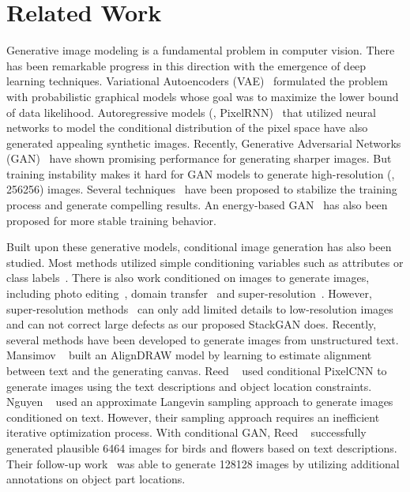 \documentclass[10pt,twocolumn,letterpaper]{article}
\begin{document}
\vspace{-2pt}
\section{Related Work}
 \vspace{-5pt}

Generative image modeling is a fundamental problem in computer vision. There has been remarkable progress in this direction with the emergence of deep learning techniques. Variational Autoencoders (VAE)~\cite{KingmaW14, RezendeMW14} formulated the problem with probabilistic graphical models whose goal was to maximize the lower bound of data likelihood. Autoregressive models (\eg, PixelRNN)~\cite{OordKK16} that utilized neural networks to model the conditional distribution of the pixel space have also generated appealing synthetic images. Recently, Generative Adversarial Networks (GAN)~\cite{goodfellow2014generative} have shown promising performance for generating sharper images. But training instability makes it hard for GAN models to generate high-resolution (\eg, 256256) images. Several techniques~\cite{Radford15, Salimans2016, MetzICLR17, ArjovskyB17, CheLJBL16} have been proposed to stabilize the training process and generate compelling results. An energy-based GAN~\cite{Zhao2016} has also been proposed for more stable training behavior.  

Built upon these generative models, conditional image generation has also been studied. Most methods utilized simple conditioning variables such as attributes or class labels~\cite{YanYSL16, Oord16, ChenDHSSA16, Odena2016}. There is also work conditioned on images to generate images, including photo editing~\cite{Brock2016, ZhuKSE16}, domain transfer~\cite{Taigmaniclr17, pix2pix2017} and super-resolution~\cite{Casper2016, Christian2016}. However, super-resolution methods~\cite{Casper2016, Christian2016} can only add limited details to low-resolution images and can not correct large defects as our proposed StackGAN does. Recently, several methods have been developed to generate images from unstructured text. Mansimov \etal~\cite{MansimovPBS15} built an AlignDRAW model by learning to estimate alignment between text and the generating canvas.  Reed \etal~\cite{reed2016iclr17} used conditional PixelCNN to generate images using the text descriptions and object location constraints. Nguyen \etal~\cite{NguyenYBDC17} used an approximate Langevin sampling approach to generate images conditioned on text. However, their sampling approach requires an inefficient iterative optimization process. With conditional GAN, Reed \etal~\cite{reed2016generative} successfully generated plausible 6464 images for birds and flowers based on text descriptions. Their follow-up work~\cite{reed2016learning} was able to generate 128128 images by utilizing additional annotations on object part locations.
\end{document}

